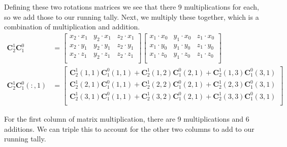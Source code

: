 \documentclass[12pt,letterpaper, onecolumn]{exam}
\begin{document}
\begin{questions}
\begin{parts}
{            Defining these two rotations matrices we see that there 9 multiplications for each, so we add those to our running tally.
            Next, we multiply these together, which is a combination of multiplication and addition.
            \begin{equation}
                \begin{split}
                    \mathbf{C}_2^1\mathbf{C}_1^0 & =
                    \begin{bmatrix}
                        x_2 \cdot x_1 & y_2 \cdot x_1 & z_2 \cdot x_1 \\
                        x_2 \cdot y_1 & y_2 \cdot y_1 & z_2 \cdot y_1 \\
                        x_2 \cdot z_1 & y_2 \cdot z_1 & z_2 \cdot z_1 \\
                    \end{bmatrix}
                    \begin{bmatrix}
                        x_1 \cdot x_0 & y_1 \cdot x_0 & z_1 \cdot x_0 \\
                        x_1 \cdot y_0 & y_1 \cdot y_0 & z_1 \cdot y_0 \\
                        x_1 \cdot z_0 & y_1 \cdot z_0 & z_1 \cdot z_0 \\
                    \end{bmatrix} \\
                    \mathbf{C}_2^1\mathbf{C}_1^0 (:,1) & =
                    \begin{bmatrix}
                        \mathbf{C}_2^1(1,1)\mathbf{C}_1^0(1,1) + \mathbf{C}_2^1(1,2)\mathbf{C}_1^0(2,1) + \mathbf{C}_2^1(1,3)\mathbf{C}_1^0(3,1) \\
                        \mathbf{C}_2^1(2,1)\mathbf{C}_1^0(1,1) + \mathbf{C}_2^1(2,2)\mathbf{C}_1^0(2,1) + \mathbf{C}_2^1(2,3)\mathbf{C}_1^0(3,1) \\
                        \mathbf{C}_2^1(3,1)\mathbf{C}_1^0(1,1) + \mathbf{C}_2^1(3,2)\mathbf{C}_1^0(2,1) + \mathbf{C}_2^1(3,3)\mathbf{C}_1^0(3,1) \\
                    \end{bmatrix}
                \end{split}
                \label{eq:3}
            \end{equation}

            For the first column of matrix multiplication, there are 9 multiplications and 6 additions. We can triple this to account for the other two columns to add to our running tally.

}
\end{parts}
\end{questions}
\end{document}
